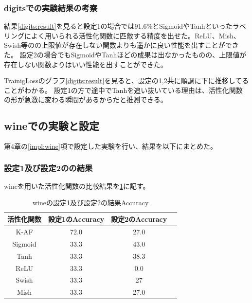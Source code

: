 \subsubsection{digitsでの実験結果の考察}
結果\ref{digits:result}を見ると設定1の場合では91.6\%とSigmoidやTanhといったラベリングによく用いられる活性化関数に匹敵する精度を出せた。ReLU、Mish、Swish等のの上限値が存在しない関数よりも遥かに良い性能を出すことができた。
設定2の場合でもSigmoidやTanhほどの成果は出なかったものの、上限値が存在しない関数よりはいい性能を出すことができた。

TrainigLossのグラフ\ref{digits:result}を見ると、設定の1,2共に順調に下に推移してることがわかる。
設定1の方で途中でTanhを追い抜いている理由は、活性化関数の形が急激に変わる瞬間があるからだと推測できる。


\subsection{wineでの実験と設定}
\label{ev:wineでの実験と設定}

第4章の\ref{impl:wine}項で設定した実験を行い、結果を以下にまとめた。
\subsubsection{設定1及び設定2のの結果}

wineを用いた活性化関数の比較結果を\ref{result:winetable}に記す。


\begin{table}[htbp]
    \begin{center}
        \caption{wineの設定1及び設定2の結果Accuracy}
        \label{result:winetable}
        \vspace{2mm} 
        \begin{tabular}{|c|c|c|c|}
            \hline
            活性化関数              & 設定1のAccuracy &  設定2のAccuracy \\
            \hline
            K-AF            & 72.0 & 27.0 \\
            \hline
            Sigmoid            & 33.3 & 43.0\\
            \hline
            Tanh            & 33.3 & 38.3\\
            \hline
            ReLU        & 33.3 & 0.0\\
            \hline
            Swish           & 33.3 & 27 \\
            \hline
            Mish           & 33.3 &  27.0\\
            \hline
    
        \end{tabular}
    \end{center}
\end{table}


